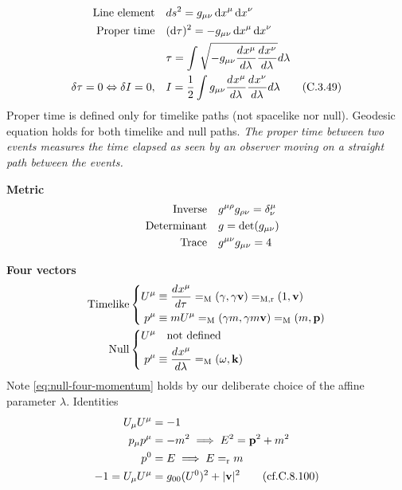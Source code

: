 \documentclass[main]{subfiles}
\begin{document}
\begin{multicols}{2}


\begin{align}
    \qq{Line element} & ds^2 = g_{\mu\nu}\dd{x}^\mu\dd{x}^\nu
    \\
    \qq{Proper time} & (\dd{\tau})^2 = -g_{\mu\nu}\dd{x}^\mu\dd{x}^\nu
    \\
    & \tau = \int \sqrt{-g_{\mu\nu} \dv{x^\mu}{\lambda}\dv{x^\nu}{\lambda}}d\lambda \label{eq:tau}
    \\
    \delta \tau = 0 \Leftrightarrow \delta I = 0 ,\quad & I = \frac{1}{2} \int g_{\mu\nu} \dv{x^\mu}{\lambda}\dv{x^\nu}{\lambda}d\lambda \tag{C.3.49}
\end{align}
Proper time is defined only for timelike paths (not spacelike nor null). Geodesic equation holds for both timelike and null paths. \textit{The proper time between two events measures the time elapsed as seen by an observer moving on a straight path between the events.}

\textbf{Metric}
\begin{align}
    \qq{Inverse} & g^{\mu\rho} g_{\rho\nu} = \delta^\mu_\nu
    \\
    \qq{Determinant} & g = \det(g_{\mu\nu})
    \\
    \qq{Trace} & g^{\mu\nu} g_{\mu\nu} = 4
\end{align}

\textbf{Four vectors}
\begin{align}
    \text{Timelike} & \left\{
    \begin{aligned}
    U^\mu &\equiv \dv{x^\mu}{\tau} 
    =_\text{M} (\gamma, \gamma \vb{v})
    =_\text{M,r} (1, \vb{v})\\
    p^\mu &\equiv mU^\mu 
    =_\text{M} (\gamma m, \gamma m \vb{v})
    =_\text{M} (m, \vb{p})
    \end{aligned}
    \right.
    \\
    \text{Null} & \left\{
    \begin{aligned}
    U^\mu &\qq{not defined}\\
    p^\mu &\equiv \dv{x^\mu}{\lambda}
    =_\text{M} (\omega, \vb{k}) \label{eq:null-four-momentum}
    \end{aligned}
    \right.
\end{align}
Note \eqref{eq:null-four-momentum} holds by our deliberate choice of the affine parameter $\lambda$. Identities
\begin{align}
    U_\mu U^\mu &= -1
    \\
    p_\mu p^\mu &= -m^2 \implies E^2 = \vb{p}^2 + m^2
    \\
    p^0 &= E \implies E =_\text{r} m
    \\
    -1 = U_\mu U^\mu &= g_{00}(U^0)^2 + |\vb{v}|^2 \tag{cf.C.8.100}
\end{align}


\end{multicols}
\end{document}
